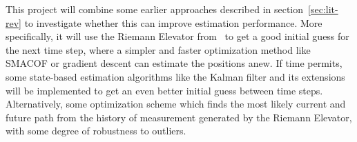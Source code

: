 This project will combine some earlier approaches described in section~\ref{sec:lit-rev} to investigate whether this can improve estimation performance. More specifically, it will use the Riemann Elevator from~\cite{R_elevator} to get a good initial guess for the next time step, where a simpler and faster optimization method like SMACOF or gradient descent can estimate the positions anew. If time permits, some state-based estimation algorithms like the Kalman filter and its extensions will be implemented to get an even better initial guess between time steps. Alternatively, some optimization scheme which finds the most likely current and future path from the history of measurement generated by the Riemann Elevator, with some degree of robustness to outliers. 